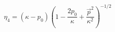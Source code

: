 \begin{equation}
 \eta_{4}=(\kappa-p_{0})\left(1-\frac{2p_{0}}{\kappa}+\frac{\vec{p}^{2}}
 {\kappa^{2}} \right)^{-1/2}
\end{equation}

